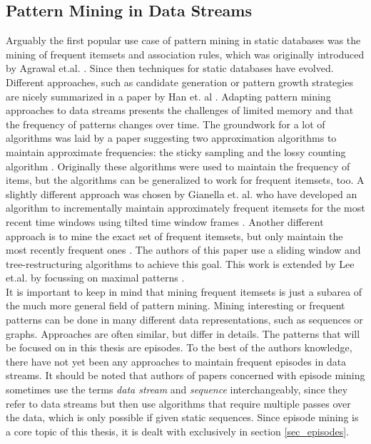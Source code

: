 \subsection{Pattern Mining in Data Streams}
\label{subsec_PatternMining}
Arguably the first popular use case of pattern mining in static databases was the mining of frequent itemsets and association rules, which was originally introduced by Agrawal et.al. \cite{agrawal1993mining}. Since then techniques for static databases have evolved. Different approaches, such as candidate generation or pattern growth strategies are nicely summarized in a paper by Han et. al \cite{han2007frequent}. Adapting pattern mining approaches to data streams presents the challenges of limited memory and that the frequency of patterns changes over time. The groundwork for a lot of algorithms was laid by a paper suggesting two approximation algorithms to maintain approximate frequencies: the sticky sampling and the lossy counting algorithm \cite{manku2002approximate}. Originally these algorithms were used to maintain the frequency of items, but the algorithms can be generalized to work for frequent itemsets, too. A slightly different approach was chosen by Gianella et. al. who have developed an algorithm to incrementally maintain approximately frequent itemsets for the most recent time windows using tilted time window frames \cite{giannella2003mining}. Another different approach is to mine the exact set of frequent itemsets, but only maintain the most recently frequent ones \citep{tanbeer2009sliding}. The authors of this paper use a sliding window and tree-restructuring algorithms to achieve this goal. This work is extended by Lee et.al. by focussing on maximal patterns \cite{lee2014sliding}. \\
It is important to keep in mind that mining frequent itemsets is just a subarea of the much more general field of pattern mining. Mining interesting or frequent patterns can be done in many different data representations, such as sequences \cite{mendes2008stream} or graphs. Approaches are often similar, but differ in details. The patterns that will be focused on in this thesis are episodes. To the best of the authors knowledge, there have not yet been any approaches to maintain frequent episodes in data streams. It should be noted that authors of papers concerned with episode mining sometimes use the terms \textit{data stream} and \textit{sequence} interchangeably, since they refer to data streams but then use algorithms that require multiple passes over the data, which is only possible if given static sequences. Since episode mining is a core topic of this thesis, it is dealt with exclusively in section \ref{sec_episodes}.


